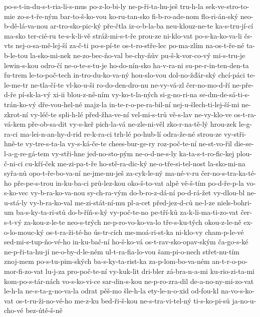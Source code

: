 po-s-t-in-du-s-t-ria-li-s-mus
po-z-lo-bi-ly
ne-p-ři-ta-hu-ješ
tru-h-la
sek-ve-stro-to-mie
zo-s-t-ře-ným
bar-to-š-ko-vou
ko-ru-tan-sko
fi-b-ro-ade-nom
flo-ri-án-ský
neo-b-dě-lá-va-nou
ar-tro-sko-pic-ký
pře-čtla
iz-o-b-la-ba
neu-klouz-ne-te
ka-s-tru-jí-cí
ma-sko
ter-cié-ru
te-s-k-li-vě
stráž-mi-s-t-ře
prou-ze
ni-klo-vat
po-s-ka-ko-va-li
čs-vts
nej-o-sa-mě-lej-ší
za-č-ti
po-s-pí-te
os-t-ro-stře-lec
po-ma-zlím
na-os-t-ře-né
ta-b-le-tou
la-sko-mi-nek
ne-zo-bec-ňo-val
be-chy-ňův
pu-š-k-vor-co-vý
mi-s-tru-je
lewin-s-kou
odro-čí
ne-o-te-s-tu-je
ho-do-nín-sko
ha-v-ra-ni
su-pe-r-in-ten-den-ta
fu-trem
le-to-poč-tech
in-tro-du-ko-va-ný
hou-slo-vou
dol-no-žďár-ský
chcí-páci
te-le-me-tr
ne-tla-čí-te
vl-ko-u-ši
ro-do-den-dro-nu
ne-vy-vá-zl
čer-no-mo-d-ří
ne-pře-d-ře
pí-sk-la-vý
xi-ii
blou-z-ně-ním
vy-ko-t-la-ných
si-g-no-ri-na
se-dm-de-sá-ti-s-trán-ko-vý
dře-vou-hel-né
majz-la
in-te-r-o-pe-ra-bil-ní
nej-u-šlech-ti-lej-ší-mi
ne-zkrot-ní
vy-léč-te
spli-h-lé
před-žha-ve-ní
vel-mi-s-trů
vě-s-lav
ne-vy-klo-ve
os-t-ra-vá-kem
pře-ob-sa-dit
vy-s-keř
pich-la-vá
ne-zle-ni-věl
zko-r-na-tě-lý
hrou-zek
le-g-ra-ci
ma-lei-n-an-hy-d-rid
re-k-ra-ci
trh-lé
po-hub-lí
odra-že-né
strou-ze
vy-stři-hně-te
vy-tre-s-ta-la
vy-s-ká-če-te
chees-bur-ge-ry
roz-poč-te-ní
ne-st-vo-řil
die-se-l-a-g-re-gá-tem
vy-stři-hne
jed-no-sto-pým
ne-o-d-ne-s-ly
ka-ta-s-t-ro-fic-kej
plou-č-ni-ci
cu-kří-ček
me-zi-pa-t-ře
ho-stě-ra-dic-ký
ne-o-tře-si-tel-nost
la-sko-mi-na
syřa-nů
opo-t-ře-bo-va-ní
ne-jme-nu-ješ
za-cyk-le-ný
ma-né-v-ru
čer-no-s-tra-ka-té-ho
pře-pe-s-trou
in-ku-ba-ci
prů-lez-kou
oko-š-to-vat
alpě
vě-š-tím
po-d-ře-p-la
vo-s-ko-vec
vy-b-ra-ko-va-nou
sy-ch-ra-vým
do-b-ro-z-dá-ní
po-d-rá-žet
vy-dlou-bl
ne-u-stá-ly
vy-b-ra-ko-val
me-zi-stát-ní-mu
pl-a-cet
před-jez-d-ců
ne-l-ze
niels-bohri-um
ba-s-ky-ta-ri-stů
do-b-říň-s-ký
vy-poč-te-no
pe-tří-ků
za-k-li-ma-ti-zo-vat
čer-s-t-vý
za-kou-z-le-te
neo-s-trých
ne-p-ro-vo-ko-va-lo
tře-s-ku-tých
okou-z-le-ně
ex-o-lo-mouc-ký
os-t-ra-ži-té-ho
ús-tr-cích
me-moá-ri-st-ka
ni-klo-vy
cham-p-le-vé
sed-mi-s-tup-ňo-vé-ho
in-ku-bač-ní
ho-š-ko-vá
os-t-rav-sko-opav-ským
ča-go-s-ké
ne-p-ři-ta-hu-jí
ne-o-by-d-le-ném
ul-t-ra-fia-lo-vou
šam-pi-o-nech
střet-nu-tím
znoj-mem
po-s-tu-pim-ských
ba-s-ky-ta-rist-ka
za-p-lom-bo-va-ném
an-t-r-o-po-mor-fi-zo-vat
lu-j-za
pro-poč-te-ní
vy-kuk-lit
dri-bler
zá-bra-n-a-mi
ku-rio-zi-ta-mi
kom-po-s-tár-nách
vo-s-ko-vi-ce
sar-din-s-kou
ne-p-ro-zra-dil
de-a-no-ny-mi-zo-vat
le-h-la
ne-s-ta-g-no-va-la
odrat
pěš-mo
šle-h-la
ety-le-n-o-xid
od-fou-kl
na-vo-s-ko-vat
os-t-ru-ži-no-vé-ho
me-z-ku
bed-ři-š-kou
ne-s-tra-vi-tel-ný
ti-s-ko-pi-sů
ja-no-u-cho-vé
bez-útě-š-ně
